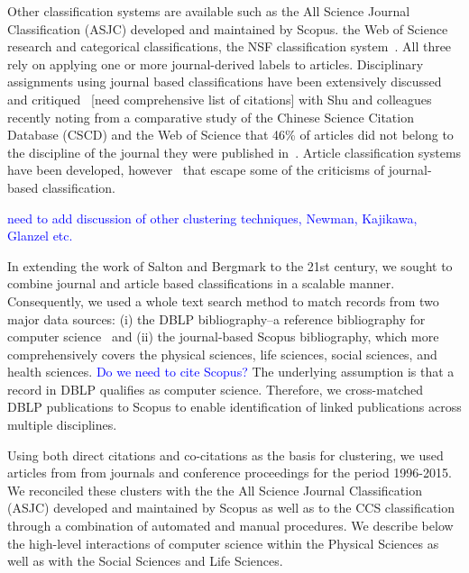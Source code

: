 Other classification systems are available such as the All Science Journal Classification (ASJC) developed and maintained by Scopus. the Web of Science research and categorical classifications, the NSF classification system~\cite{nsf_classification}. All three rely on applying one or more journal-derived labels to articles. Disciplinary assignments using journal based classifications have been extensively discussed and critiqued~\cite{wang_large-scale_2016} [need comprehensive list of citations] with Shu and colleagues recently noting from a comparative study of the Chinese Science Citation Database (CSCD) and the Web of Science that 46\% of articles did not belong to the discipline of the journal they were published in~\cite{shu_comparing_2019}. Article classification systems have been developed, however~\cite{traag_louvain_2019,boyack_classification_2014,waltman_new_2012} that escape some of the criticisms of journal-based classification.
 
 \textcolor{blue}{need to add discussion of other clustering techniques, Newman, Kajikawa, Glanzel etc.}
 
In extending the work of Salton and Bergmark to the 21st century, we sought to combine journal and article based classifications in a scalable manner. Consequently, we used a whole text search method to match records from two major data sources: (i) the DBLP bibliography--a reference bibliography for computer science~\cite{dblp_ref} and  (ii) the journal-based Scopus bibliography, which more comprehensively covers the physical sciences, life sciences, social sciences, and health sciences. 
\textcolor{blue}{Do we need to cite Scopus?}
The underlying assumption is that a record in DBLP qualifies as computer science. Therefore, we cross-matched DBLP publications to Scopus to  enable identification of linked publications across multiple disciplines.

Using both direct citations and co-citations as the basis for clustering, we used articles from from journals and conference proceedings for the period 1996-2015. We reconciled these clusters with the the All Science Journal Classification (ASJC) developed and maintained by Scopus as well as to the CCS classification through a combination of automated and manual procedures. We describe below the high-level interactions of computer science within the Physical Sciences as well as with the Social Sciences and Life Sciences. 

